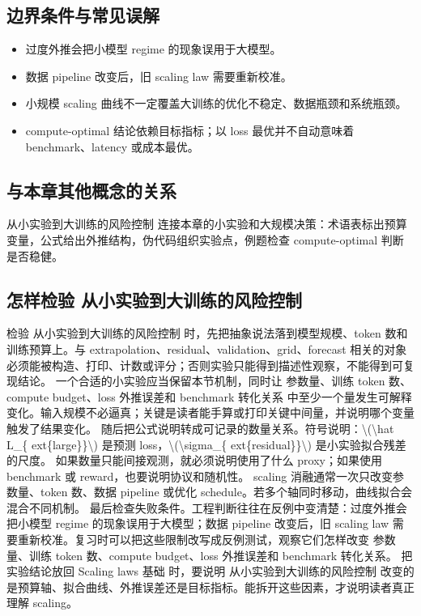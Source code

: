 \documentclass[a4paper]{article}
\begin{document}
\subsection{边界条件与常见误解}
\begin{itemize}
\item 过度外推会把小模型 regime 的现象误用于大模型。
\item 数据 pipeline 改变后，旧 scaling law 需要重新校准。
\item 小规模 scaling 曲线不一定覆盖大训练的优化不稳定、数据瓶颈和系统瓶颈。
\item compute-optimal 结论依赖目标指标；以 loss 最优并不自动意味着 benchmark、latency 或成本最优。
\end{itemize}
\subsection{与本章其他概念的关系}
从小实验到大训练的风险控制 连接本章的小实验和大规模决策：术语表标出预算变量，公式给出外推结构，伪代码组织实验点，例题检查 compute-optimal 判断是否稳健。
\subsection{怎样检验 从小实验到大训练的风险控制}
检验 从小实验到大训练的风险控制 时，先把抽象说法落到模型规模、token 数和训练预算上。与 extrapolation、residual、validation、grid、forecast 相关的对象必须能被构造、打印、计数或评分；否则实验只能得到描述性观察，不能得到可复现结论。
一个合适的小实验应当保留本节机制，同时让 参数量、训练 token 数、compute budget、loss 外推误差和 benchmark 转化关系 中至少一个量发生可解释变化。输入规模不必逼真；关键是读者能手算或打印关键中间量，并说明哪个变量触发了结果变化。
随后把公式说明转成可记录的数量关系。符号说明：\textbackslash{}(\textbackslash{}hat L\_\{ ext\{large\}\}\textbackslash{}) 是预测 loss，\textbackslash{}(\textbackslash{}sigma\_\{ ext\{residual\}\}\textbackslash{}) 是小实验拟合残差的尺度。 如果数量只能间接观测，就必须说明使用了什么 proxy；如果使用 benchmark 或 reward，也要说明协议和随机性。
scaling 消融通常一次只改变参数量、token 数、数据 pipeline 或优化 schedule。若多个轴同时移动，曲线拟合会混合不同机制。
最后检查失败条件。工程判断往往在反例中变清楚：过度外推会把小模型 regime 的现象误用于大模型；数据 pipeline 改变后，旧 scaling law 需要重新校准。复习时可以把这些限制改写成反例测试，观察它们怎样改变 参数量、训练 token 数、compute budget、loss 外推误差和 benchmark 转化关系。
把实验结论放回 Scaling laws 基础 时，要说明 从小实验到大训练的风险控制 改变的是预算轴、拟合曲线、外推误差还是目标指标。能拆开这些因素，才说明读者真正理解 scaling。
\end{document}

